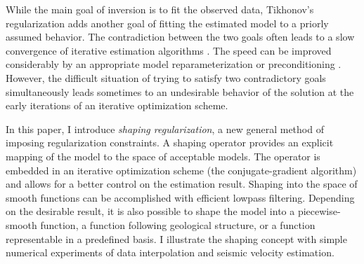 While the main goal of inversion is to fit the observed data,
Tikhonov's regularization adds another goal of fitting the estimated
model to a priorly assumed behavior. The contradiction between the two
goals often leads to a slow convergence of iterative estimation
algorithms \cite[]{harlan}. The speed can be improved considerably by an
appropriate model reparameterization or preconditioning
\cite[]{GEO68-02-05770588}. However, the difficult situation
of trying to satisfy two contradictory goals simultaneously 
leads sometimes to an undesirable behavior of the solution at the early
iterations of an iterative optimization scheme.

In this paper, I introduce \emph{shaping regularization}, a new
general method of imposing regularization constraints. A shaping
operator provides an explicit mapping of the model to the space of
acceptable models. The operator is embedded in an iterative
optimization scheme (the conjugate-gradient algorithm) and allows for
a better control on the estimation result. Shaping into the space of
smooth functions can be accomplished with efficient lowpass
filtering. Depending on the desirable result, it is also possible to
shape the model into a piecewise-smooth function, a function following
geological structure, or a function representable in a predefined
basis.
I illustrate the shaping concept with simple numerical experiments
of data interpolation and seismic velocity estimation.

